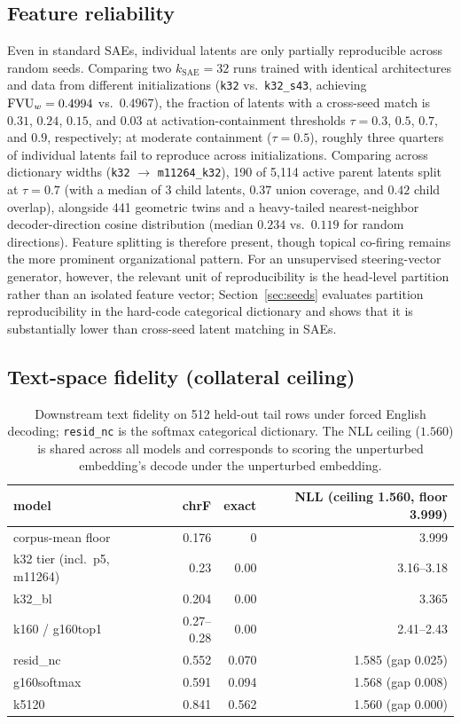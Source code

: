\subsection{Feature reliability}

Even in standard SAEs, individual latents are only partially reproducible
across random seeds. Comparing two $k_{\mathrm{SAE}}{=}32$ runs trained
with identical architectures and data from different initializations
(\texttt{k32} vs.\ \texttt{k32\_s43}, achieving $\mathrm{FVU}_w = 0.4994$ vs.\
$0.4967$), the fraction of latents with a cross-seed match is $0.31$,
$0.24$, $0.15$, and $0.03$ at activation-containment thresholds
$\tau = 0.3$, $0.5$, $0.7$, and $0.9$, respectively; at moderate
containment ($\tau{=}0.5$), roughly three quarters of individual latents
fail to reproduce across initializations. Comparing across dictionary
widths (\texttt{k32} $\to$ \texttt{m11264\_k32}), 190 of 5{,}114 active
parent latents split at $\tau{=}0.7$ (with a median of 3 child latents,
$0.37$ union coverage, and $0.42$ child overlap), alongside 441 geometric
twins and a heavy-tailed nearest-neighbor decoder-direction cosine
distribution (median $0.234$ vs.\ $0.119$ for random directions). Feature
splitting is therefore present, though topical co-firing remains the more
prominent organizational pattern. For an unsupervised steering-vector
generator, however, the relevant unit of reproducibility is the
head-level partition rather than an isolated feature vector;
Section~\ref{sec:seeds} evaluates partition reproducibility in the
hard-code categorical dictionary and shows that it is substantially lower
than cross-seed latent matching in SAEs.

\subsection{Text-space fidelity (collateral ceiling)}
\label{sec:textfid}

\begin{table}[htbp]\centering\small
\begin{tabular}{@{}lrrr@{}}
\toprule
model & chrF & exact & NLL (ceiling 1.560, floor 3.999) \\
\midrule
corpus-mean floor & 0.176 & 0 & 3.999 \\
k32 tier (incl.\ p5, m11264) & 0.23 & 0.00 & 3.16--3.18 \\
k32\_bl          & 0.204 & 0.00 & 3.365 \\
k160 / g160top1  & 0.27--0.28 & 0.00 & 2.41--2.43 \\
resid\_nc        & 0.552 & 0.070 & 1.585 (gap 0.025) \\
g160softmax      & 0.591 & 0.094 & 1.568 (gap 0.008) \\
k5120            & 0.841 & 0.562 & 1.560 (gap 0.000) \\
\bottomrule
\end{tabular}
\caption{Downstream text fidelity on 512 held-out tail rows under forced
English decoding; \texttt{resid\_nc} is the softmax categorical
dictionary. The NLL ceiling ($1.560$) is shared across all models
and corresponds to scoring the unperturbed embedding's decode under the
unperturbed embedding.}
\end{table}

